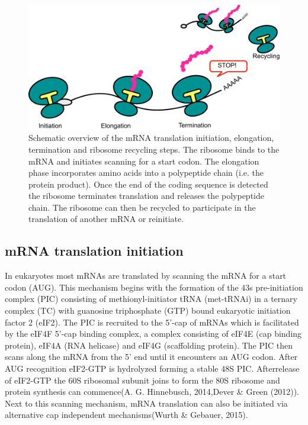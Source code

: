 \documentclass[12pt,openany]{book}
\begin{document}
\begin{figure}
  \includegraphics{./figures/doodleTranslation.pdf}
  \caption{Schematic overview of the mRNA translation initiation, elongation, termination and ribosome recycling steps. The ribosome binds to the mRNA and initiates scanning for a start codon. The elongation phase incorporates amino acids into a polypeptide chain (i.e. the protein product). Once the end of the coding sequence is detected the ribosome terminates translation and releases the polypeptide chain. The ribosome can then be recycled to participate in the translation of another mRNA or reinitiate. \label{fig:doodlemRNASteps}}
\end{figure}

\subsection{mRNA translation initiation}

In eukaryotes most mRNAs are translated by scanning the mRNA for a start
codon (AUG). This mechanism begins with the formation of the 43s
pre-initiation complex (PIC) consisting of methionyl-initiator tRNA
(met-tRNAi) in a ternary complex (TC) with guanosine triphosphate (GTP)
bound eukaryotic initiation factor 2 (eIF2). The PIC is recruited to the
5'-cap of mRNAs which is facilitated by the eIF4F 5'-cap binding
complex, a complex consisting of eIF4E (cap binding protein), eIF4A (RNA
helicase) and eIF4G (scaffolding protein). The PIC then scans along the
mRNA from the 5' end until it encounters an AUG codon. After AUG
recognition eIF2-GTP is hydrolyzed forming a stable 48S PIC.
Afterrelease of eIF2-GTP the 60S ribosomal subunit joins to form the 80S
ribosome and protein synthesis can commence(A. G. Hinnebusch, 2014,Dever
\& Green (2012)). Next to this scanning mechanism, mRNA translation can
also be initiated via alternative cap independent mechanisms(Wurth \&
Gebauer, 2015).
\end{document}
